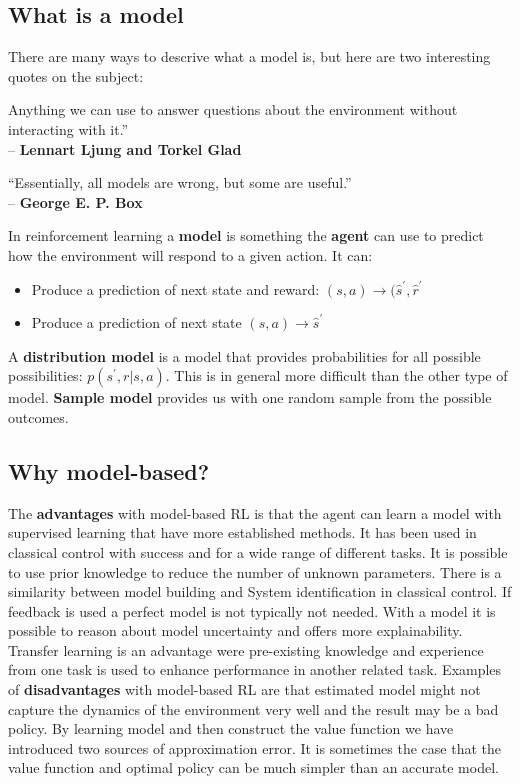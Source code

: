 \subsection{What is a model}
There are many ways to descrive what a model is, but here are two interesting quotes on the subject:


\begin{wbox}{}
\begin{center}
Anything we can use to answer questions about the environment without interacting
with it.” \\– \textbf{Lennart Ljung and Torkel Glad}

\vspace{0.5 cm}

“Essentially, all models are wrong, but some are useful.” \\– \textbf{George E. P. Box}
\end{center}
\end{wbox}

In reinforcement learning a \textbf{model} is something the \textbf{agent} can use to predict how the environment will respond to a given action. It can:
	
\begin{itemize}
	\item Produce a prediction of next state and reward: $(s,a) \rightarrow (\hat{s}^{\prime}, \hat{r}^{\prime}$
	\item Produce a prediction of next state $(s,a) \rightarrow \hat{s}^{\prime}$
\end{itemize}

A \textbf{distribution model} is a model that provides probabilities for all possible possibilities: $p(s^{\prime}, r|s,a)$. This is in general more difficult than the other type of model. \textbf{Sample model} provides us with one random sample from the possible outcomes. 

\subsection{Why model-based?}
The \textbf{advantages} with model-based RL is that the agent can learn a model with supervised learning that have more established methods. It has been used in classical control with success and for a wide range of different tasks. It is possible to use prior knowledge to reduce the number of unknown parameters. There is a similarity between model building and System identification in classical control. If feedback is used a perfect model is not typically not needed. With a model it is possible to reason about model uncertainty and offers more explainability. Transfer learning is an advantage were pre-existing knowledge and experience from one task is used to enhance performance in another related task. Examples of \textbf{disadvantages} with model-based RL are that estimated model might not capture the dynamics of the environment very well and the result may be a bad policy. By learning model and then construct the value function we have introduced two sources of approximation error. It is sometimes the case that the value function and optimal policy can be much simpler than an accurate model. 

